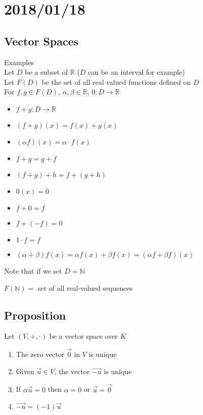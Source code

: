 \documentclass[12pt]{article}
\renewcommand{\v}[1]{\overrightarrow{#1}}
\newcommand{\real}[0]{\mathbb{R}}
\renewcommand{\natural}[0]{\mathbb{N}}
\begin{document}
\section{2018/01/18}

\subsection{Vector Spaces}

Examples \\
Let $D$ be a subset of $\real$ ($D$ can be an interval for example) \\
Let $F(D)$ be the set of all real valued functions defined on $D$ \\
For $f, g \in F(D)$, $\alpha, \beta \in \real$, $0 : D \rightarrow \real$

\begin{itemize}
	\item $f + g : D \rightarrow \real$
	\item $(f + g)(x) = f(x) + g(x)$
	\item $(\alpha f)(x) = \alpha \cdot f(x)$
	\item $f + g = g + f$
	\item $(f + g) + h = f + (g + h)$
	\item $0(x) = 0$
	\item $f + 0 = f$
	\item $f + (-f) = 0$
	\item $1 \cdot f = f$
	\item $(\alpha + \beta) f(x) = \alpha f(x) + \beta f(x) = (\alpha f + \beta f)(x)$
\end{itemize}

Note that if we set $D = \natural$

$F(\natural) =$ set of all real-valued sequences

\subsection{Proposition}

Let $(V, +, \cdot)$ be a vector space over $K$


\begin{enumerate}
	\item The zero vector $\v{0}$ in $V$ is unique
	\item Given $\v{u} \in V$, the vector $\v{-u}$ is unique
	\item If $\alpha \v{u} = 0$ then $\alpha = 0$ or $\v{u} = \v{0}$
	\item $\v{-u} = (-1) \v{u}$
\end{enumerate}
\end{document}
